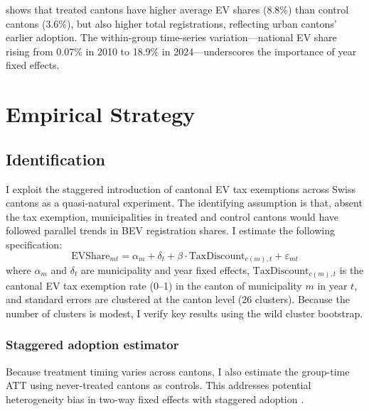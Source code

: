 \documentclass[12pt]{article}
\begin{document}


 shows that treated cantons have higher average EV shares (8.8\%) than control cantons (3.6\%), but also higher total registrations, reflecting urban cantons' earlier adoption. The within-group time-series variation---national EV share rising from 0.07\% in 2010 to 18.9\% in 2024---underscores the importance of year fixed effects.

\section{Empirical Strategy}

\subsection{Identification}

I exploit the staggered introduction of cantonal EV tax exemptions across Swiss cantons as a quasi-natural experiment. The identifying assumption is that, absent the tax exemption, municipalities in treated and control cantons would have followed parallel trends in BEV registration shares. I estimate the following specification:
\begin{equation}
\text{EVShare}_{mt} = \alpha_m + \delta_t + \beta \cdot \text{TaxDiscount}_{c(m),t} + \varepsilon_{mt}
\label{eq:main}
\end{equation}
where $\alpha_m$ and $\delta_t$ are municipality and year fixed effects, $\text{TaxDiscount}_{c(m),t}$ is the cantonal EV tax exemption rate (0--1) in the canton of municipality $m$ in year $t$, and standard errors are clustered at the canton level (26 clusters). Because the number of clusters is modest, I verify key results using the \citet{cameron2008bootstrap} wild cluster bootstrap.

\subsubsection*{Staggered adoption estimator} Because treatment timing varies across cantons, I also estimate the \citet{callaway2021difference} group-time ATT using never-treated cantons as controls. This addresses potential heterogeneity bias in two-way fixed effects with staggered adoption \citep{goodman2021difference, sun2021estimating, dechaisemartin2020two, borusyak2024revisiting}.
\end{document}
